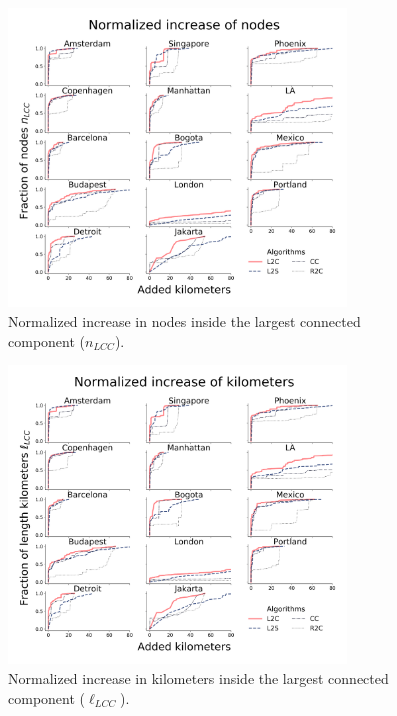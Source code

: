 \begin{figure}[h!]
  \centering
  \includegraphics[width=0.8\textwidth]{images/datadriven/SI_Nodes.png}
  \caption{Normalized increase in nodes inside the largest connected component ($n_{LCC}$).}
  \label{fig:NodesIncrease}
\end{figure}

\begin{figure}[h!]
  \centering
  \includegraphics[width=0.8\textwidth]{images/datadriven/SI_Lengths.png}
  \caption{Normalized increase in kilometers inside the largest connected component ($\ell_{LCC}$).}
  \label{fig:Lengthsncrease}
\end{figure}

